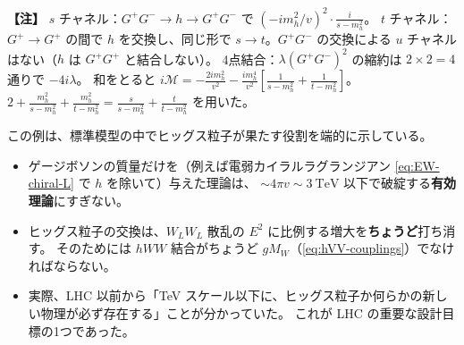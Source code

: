 \documentclass[uplatex,dvipdfmx,a4paper,11pt,openany]{jsbook}
\newenvironment{note}{\vspace{1ex}\par\footnotesize\noindent\textbf{【注】}}{\par\vspace{1ex}}
\numberwithin{equation}{chapter}
\theoremstyle{definition}
\theoremstyle{plain}
\theoremstyle{remark}
\begin{document}
\begin{note}
$s$ チャネル：$G^+G^-\to h\to G^+G^-$ で $(-im_h^2/v)^2\cdot\frac{i}{s-m_h^2}$。
$t$ チャネル：$G^+\to G^+$ の間で $h$ を交換し、同じ形で $s\to t$。$G^+G^-$ の交換による $u$ チャネルはない（$h$ は $G^+G^+$ と結合しない）。
4点結合：$\lambda(G^+G^-)^2$ の縮約は $2\times2=4$ 通りで $-4i\lambda$。
和をとると $i\mathcal M=-\frac{2im_h^2}{v^2}-\frac{im_h^4}{v^2}\left[\frac{1}{s-m_h^2}+\frac{1}{t-m_h^2}\right]$。
$2+\frac{m_h^2}{s-m_h^2}+\frac{m_h^2}{t-m_h^2}=\frac{s}{s-m_h^2}+\frac{t}{t-m_h^2}$ を用いた。
\end{note}
この例は、標準模型の中でヒッグス粒子が果たす役割を端的に示している。
\begin{itemize}
    \item ゲージボソンの質量だけを（例えば電弱カイラルラグランジアン \eqref{eq:EW-chiral-L} で $h$ を除いて）与えた理論は、
    $\sim4\pi v\sim3\ \mathrm{TeV}$ 以下で破綻する\textbf{有効理論}にすぎない。
    \item ヒッグス粒子の交換は、$W_LW_L$ 散乱の $E^2$ に比例する増大を\textbf{ちょうど}打ち消す。
    そのためには $hWW$ 結合がちょうど $gM_W$（\eqref{eq:hVV-couplings}）でなければならない。
    \item 実際、LHC 以前から「TeV スケール以下に、ヒッグス粒子か何らかの新しい物理が必ず存在する」ことが分かっていた。
    これが LHC の重要な設計目標の1つであった。
\end{itemize}
\end{document}
